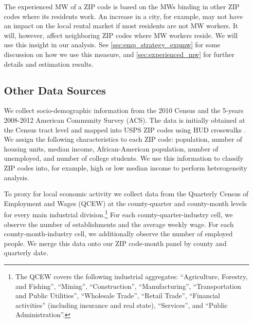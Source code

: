 The experienced MW of a ZIP code is based on the MWs binding in other ZIP codes 
where its residents work. An increase in a city, for example, may not have an impact on 
the local rental market if most residents are not MW workers. It will, however, 
affect neighboring ZIP codes where MW workers reside. We will use this insight in our 
analysis. See \autoref{sec:emp_strategy_expmw} for some discussion on how we use this 
measure, and \autoref{sec:experienced_mw} for further details and estimation results.

\subsection{Other Data Sources}\label{sec:data/other_data}

We collect socio-demographic information from the 2010 Census and the 5-years 2008-2012 
American Community Survey (ACS). The data is initially obtained at the Census tract 
level and mapped into USPS ZIP codes using HUD crosswalks \parencite{hudCrosswalks}. We 
assign the following characteristics to each ZIP code: population, number of housing units, 
median income, African-American population, number of unemployed, and number of college 
students. We use this information to classify ZIP codes into, for example, high or low median 
income to perform heterogeneity analysis.

To proxy for local economic activity we collect data from the Quarterly Census of 
Employment and Wages (QCEW) at the county-quarter and county-month levels for every main 
industrial division.\footnote{The QCEW covers the following industrial aggregates: 
	``Agriculture, Forestry, and Fishing'', ``Mining'', ``Construction'', ``Manufacturing'', 
	``Transportation and Public Utilities'', ``Wholesale Trade'', ``Retail Trade'',
	``Financial activities'' (including insurance and real state), ``Services'', and 
	``Public Administration''.} 
For each county-quarter-industry cell, we observe the number of establishments and the 
average weekly wage. For each county-month-industry cell, we additionally observe the number 
of employed people. We merge this data onto our ZIP code-month panel by county and 
quarterly date.


